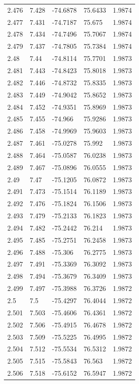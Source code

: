 \begin{tabular}{lllll}
2.476 & 7.428 & -74.6878 & 75.6433 & 1.9874 \\
2.477 & 7.431 & -74.7187 & 75.675 & 1.9874 \\
2.478 & 7.434 & -74.7496 & 75.7067 & 1.9874 \\
2.479 & 7.437 & -74.7805 & 75.7384 & 1.9874 \\
2.48 & 7.44 & -74.8114 & 75.7701 & 1.9873 \\
2.481 & 7.443 & -74.8423 & 75.8018 & 1.9873 \\
2.482 & 7.446 & -74.8732 & 75.8335 & 1.9873 \\
2.483 & 7.449 & -74.9042 & 75.8652 & 1.9873 \\
2.484 & 7.452 & -74.9351 & 75.8969 & 1.9873 \\
2.485 & 7.455 & -74.966 & 75.9286 & 1.9873 \\
2.486 & 7.458 & -74.9969 & 75.9603 & 1.9873 \\
2.487 & 7.461 & -75.0278 & 75.992 & 1.9873 \\
2.488 & 7.464 & -75.0587 & 76.0238 & 1.9873 \\
2.489 & 7.467 & -75.0896 & 76.0555 & 1.9873 \\
2.49 & 7.47 & -75.1205 & 76.0872 & 1.9873 \\
2.491 & 7.473 & -75.1514 & 76.1189 & 1.9873 \\
2.492 & 7.476 & -75.1824 & 76.1506 & 1.9873 \\
2.493 & 7.479 & -75.2133 & 76.1823 & 1.9873 \\
2.494 & 7.482 & -75.2442 & 76.214 & 1.9873 \\
2.495 & 7.485 & -75.2751 & 76.2458 & 1.9873 \\
2.496 & 7.488 & -75.306 & 76.2775 & 1.9873 \\
2.497 & 7.491 & -75.3369 & 76.3092 & 1.9873 \\
2.498 & 7.494 & -75.3679 & 76.3409 & 1.9873 \\
2.499 & 7.497 & -75.3988 & 76.3726 & 1.9872 \\
2.5 & 7.5 & -75.4297 & 76.4044 & 1.9872 \\
2.501 & 7.503 & -75.4606 & 76.4361 & 1.9872 \\
2.502 & 7.506 & -75.4915 & 76.4678 & 1.9872 \\
2.503 & 7.509 & -75.5225 & 76.4995 & 1.9872 \\
2.504 & 7.512 & -75.5534 & 76.5312 & 1.9872 \\
2.505 & 7.515 & -75.5843 & 76.563 & 1.9872 \\
2.506 & 7.518 & -75.6152 & 76.5947 & 1.9872 \\

\end{tabular}
